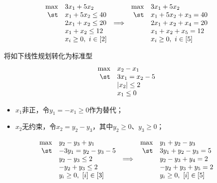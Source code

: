 \documentclass{ctexart}
\begin{document}
\begin{itemize}
          \begin{align}
              \begin{array}{rlcrl} \label{eq: illustration-standard}
                  \max & 3 x_1 + 5 x_2          &                 & \max & 3 x_1 + 5 x_2          \\
                  \st  & x_1 + 5 x_2 \le 40     &                 & \st  & x_1 + 5 x_2 + x_3 = 40 \\
                       & 2 x_1 + x_2 \le 20     & \Longrightarrow &      & 2 x_1 + x_2 + x_4 = 20 \\
                       & x_1 + x_2 \le 12       &                 &      & x_1 + x_2 + x_5 = 12   \\
                       & x_i \ge 0, ~ i \in [2] &                 &      & x_i \ge 0, ~ i \in [5]
              \end{array}
          \end{align}
\end{itemize}

\begin{example}
    将如下线性规划转化为标准型
    \begin{align*}
        \begin{array}{rlcrl}
            \max & x_2 - x_1       \\
            \st  & 3 x_1 = x_2 - 5 \\
                 & |x_2| \le 2     \\
                 & x_1 \le 0
        \end{array}
    \end{align*}
    \begin{itemize}
        \item $x_1$非正，令$y_1 = -x_1 \ge 0$作为替代；
        \item $x_2$无约束，令$x_2 = y_2 - y_3$，其中$y_2 \ge 0 $、$y_3 \ge 0$；
    \end{itemize}
    \begin{align*}
        \begin{array}{rlcrl}
            \max & y_2 - y_3 + y_1          &                 & \max & y_1 + y_2 - y_3          \\
            \st  & -3 y_1 = y_2 - y_3 - 5   &                 & \st  & 3 y_1 + y_2 - y_3 = 5    \\
                 & y_2 - y_3 \le 2          & \Longrightarrow &      & y_2 - y_3 + y_4 = 2      \\
                 & -y_2 + y_3 \le 2         &                 &      & -y_2 + y_3 + y_5 = 2     \\
                 & y_i \ge 0, ~ [i] \in [3] &                 &      & y_i \ge 0, ~ [i] \in [5]
        \end{array}
    \end{align*}
\end{example}
\end{document}
